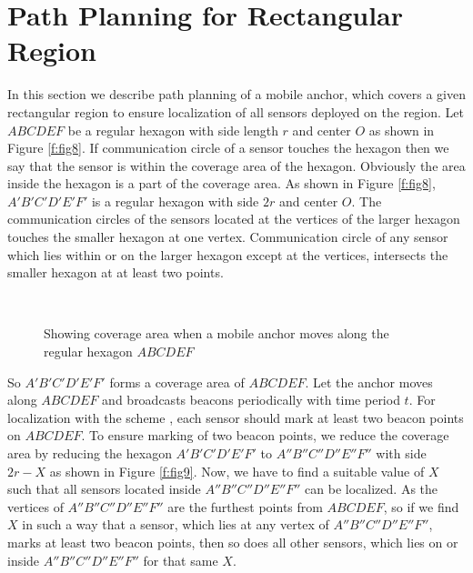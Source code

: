 \documentclass[preprint,11pt]{elsarticle}
\begin{document}
\section{Path Planning for Rectangular Region}
\label{sec:tech2}
In this section we describe path planning of a mobile anchor, which covers a given rectangular region to ensure localization of all sensors deployed
on the region. Let $ABCDEF$ be a regular hexagon with side length $r$ and center $O$ as shown in  Figure \ref{f:fig8}.
If communication circle of a sensor touches the hexagon then we say that the sensor is within the coverage area of the hexagon.
Obviously the area inside the hexagon is a part of the coverage area.  As shown in Figure \ref{f:fig8}, $A'B'C'D'E'F'$ is a regular hexagon with side $2r$ and center $O$. The communication circles of the sensors located at the vertices of the larger hexagon touches the smaller hexagon at one vertex. Communication circle of any sensor which lies within or on the larger hexagon except at the vertices, intersects the smaller hexagon at at least two points.
\begin{figure}[h]
  \centering
     ~~~~~~~~~
\caption{Showing coverage area when a mobile anchor moves along the regular hexagon $ABCDEF$}
\end{figure}
So $A'B'C'D'E'F'$ forms a coverage area of $ABCDEF$.
Let the anchor moves along $ABCDEF$ and broadcasts beacons periodically with time period $t$. For localization with the scheme \cite{Lee2009}, each sensor should mark at least two beacon points on $ABCDEF$. To ensure marking of two beacon points, we reduce the coverage area by reducing the hexagon $A'B'C'D'E'F'$ to $A''B''C''D''E''F''$ with side $2r-X$ as shown in  Figure \ref{f:fig9}. Now, we have to find a suitable value of $X$ such that all sensors located inside $A''B''C''D''E''F''$ can be localized.
As the vertices of $A''B''C''D''E''F''$ are the furthest points from $ABCDEF$, so if we find $X$ in such a way that a sensor, which lies at any vertex of $A''B''C''D''E''F''$, marks at least two beacon points, then so does all other sensors, which lies on or inside $A''B''C''D''E''F''$ for that same $X$.
\end{document}
